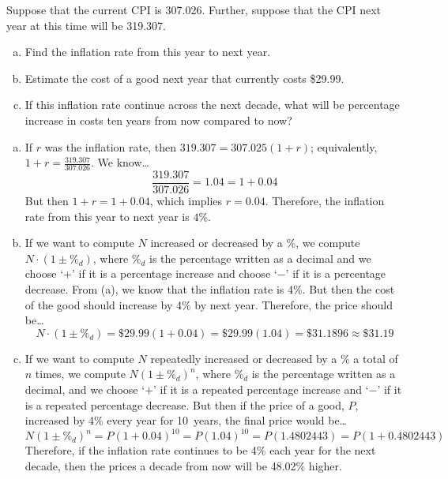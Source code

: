 \documentclass[12pt,letterpaper]{exam}
\begin{document}
\examtitle
{} 
\scores
\bottomline
\newpage

\begin{questions}

\newpage
\question[10] Suppose that the current CPI is 307.026. Further, suppose that the CPI next year at this time will be 319.307. 
	\begin{enumerate}[(a)]
	\item Find the inflation rate from this year to next year. 
	\item Estimate the cost of a good next year that currently costs \$29.99. 
	\item If this inflation rate continue across the next decade, what will be percentage increase in costs ten years from now compared to now?
	\end{enumerate} \pspace

\sol 
\begin{enumerate}[(a)]
\item If $r$ was the inflation rate, then $319.307= 307.025(1 + r)$; equivalently, $1 + r= \frac{319.307}{307.026}$. We know\dots
	\[
	\dfrac{319.307}{307.026}= 1.04= 1 + 0.04
	\]
But then $1 + r= 1 + 0.04$, which implies $r= 0.04$. Therefore, the inflation rate from this year to next year is $4\%$. \pspace

\item If we want to compute $N$ increased or decreased by a \%, we compute $N \cdot (1 \pm \%_d)$, where $\%_d$ is the percentage written as a decimal and we choose `$+$' if it is a percentage increase and choose `$-$' if it is a percentage decrease. From (a), we know that the inflation rate is 4\%. But then the cost of the good should increase by 4\% by next year. Therefore, the price should be\dots
	\[
	N \cdot (1 \pm \%_d)= \$29.99(1 + 0.04)= \$29.99(1.04)= \$31.1896 \approx \$31.19
	\] \pspace

\item If we want to compute $N$ repeatedly increased or decreased by a \% a total of $n$ times, we compute $N(1 \pm \%_d)^n$, where $\%_d$ is the percentage written as a decimal, and we choose `$+$' if it is a repeated percentage increase and `$-$' if it is a repeated percentage decrease. But then if the price of a good, $P$, increased by 4\% every year for 10~years, the final price would be\dots
	\[
	N(1 \pm \%_d)^n= P (1 + 0.04)^{10}= P(1.04)^{10}= P(1.4802443)= P(1 + 0.4802443)
	\]
Therefore, if the inflation rate continues to be 4\% each year for the next decade, then the prices a decade from now will be 48.02\% higher. 
\end{enumerate}


\end{questions}
\end{document}
